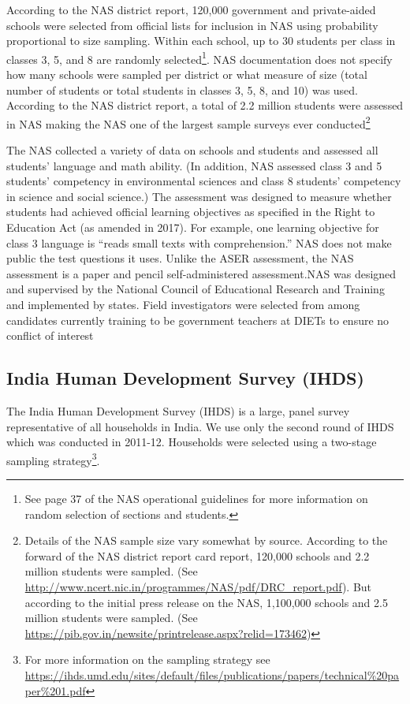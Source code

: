 \documentclass[
  11pt,
]{article}
\begin{document}
According to the NAS district report, 120,000 government and private-aided schools were selected from official lists for inclusion in NAS using probability proportional to size sampling. Within each school, up to 30 students per class in classes 3, 5, and 8 are randomly selected\footnote{See page 37 of the NAS operational guidelines for more information on random selection of sections and students.}. NAS documentation does not specify how many schools were sampled per district or what measure of size (total number of students or total students in classes 3, 5, 8, and 10) was used. According to the NAS district report, a total of 2.2 million students were assessed in NAS making the NAS one of the largest sample surveys ever conducted\footnote{Details of the NAS sample size vary somewhat by source. According to the forward of the NAS district report card report, 120,000 schools and 2.2 million students were sampled. (See \url{http://www.ncert.nic.in/programmes/NAS/pdf/DRC_report.pdf}). But according to the initial press release on the NAS, 1,100,000 schools and 2.5 million students were sampled. (See \url{https://pib.gov.in/newsite/printrelease.aspx?relid=173462})}

The NAS collected a variety of data on schools and students and assessed all students' language and math ability. (In addition, NAS assessed class 3 and 5 students' competency in environmental sciences and class 8 students' competency in science and social science.) The assessment was designed to measure whether students had achieved official learning objectives as specified in the Right to Education Act (as amended in 2017). For example, one learning objective for class 3 language is ``reads small texts with comprehension.'' NAS does not make public the test questions it uses. Unlike the ASER assessment, the NAS assessment is a paper and pencil self-administered assessment.NAS was designed and supervised by the National Council of Educational Research and Training and implemented by states. Field investigators were selected from among candidates currently training to be government teachers at DIETs to ensure no conflict of interest

\hypertarget{india-human-development-survey-ihds}{%
\subsection{India Human Development Survey (IHDS)}\label{india-human-development-survey-ihds}}

The India Human Development Survey (IHDS) is a large, panel survey representative of all households in India. We use only the second round of IHDS which was conducted in 2011-12. Households were selected using a two-stage sampling strategy\footnote{For more information on the sampling strategy see
  \url{https://ihds.umd.edu/sites/default/files/publications/papers/technical\%20paper\%201.pdf}}.
\end{document}
